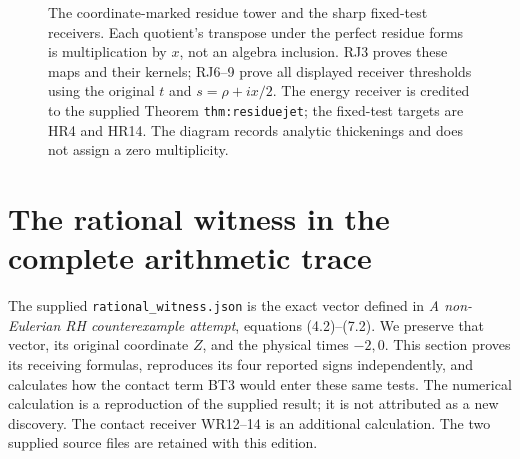 \begin{figure}[p]
\centering
{}
\caption{The coordinate-marked residue tower and the sharp fixed-test
receivers. Each quotient's transpose under the perfect residue forms
is multiplication by $x$, not an algebra inclusion. RJ3 proves these
maps and their kernels; RJ6--9 prove all displayed receiver thresholds
using the original $t$ and $s=\rho+ix/2$. The energy receiver is credited
to the supplied Theorem \texttt{thm:residuejet}; the fixed-test targets
are HR4 and HR14. The diagram records analytic thickenings and does not
assign a zero multiplicity.}
\end{figure}

\clearpage
\section{The rational witness in the complete arithmetic trace}
\label{sec:witness-receiver}

The supplied \texttt{rational\_witness.json} is the exact vector
defined in \emph{A non-Eulerian RH counterexample attempt}, equations
(4.2)--(7.2). We preserve that vector, its original coordinate $Z$,
and the physical times $-2,0$. This section proves its receiving
formulas, reproduces its four reported signs independently, and
calculates how the contact term BT3 would enter these same tests.
The numerical calculation is a reproduction of the supplied result;
it is not attributed as a new discovery. The contact receiver WR12--14
is an additional calculation. The two supplied source files are
retained with this edition.

